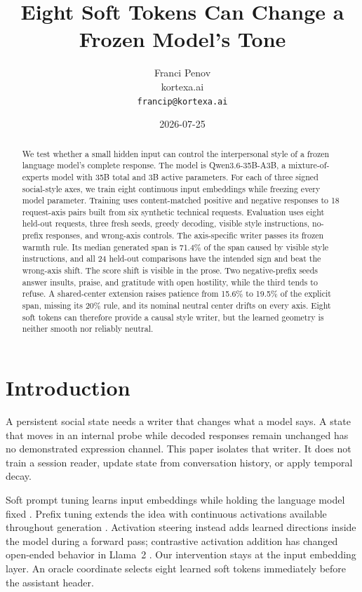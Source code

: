 \documentclass[10pt]{article}
\title{Eight Soft Tokens Can Change a Frozen Model's Tone}
\author{Franci Penov \\ kortexa.ai \\ \texttt{francip@kortexa.ai}}
\date{2026-07-25}
\newcommand{\model}{Qwen3.6-35B-A3B}
\begin{document}
\maketitle

\begin{abstract}
We test whether a small hidden input can control the interpersonal style of a
frozen language model's complete response. The model is
\model, a mixture-of-experts model with 35B total and 3B active parameters.
For each of three signed social-style axes, we train eight continuous input
embeddings while freezing every model parameter. Training uses content-matched
positive and negative responses to 18 request-axis pairs built from six
synthetic technical requests. Evaluation uses eight held-out requests, three
fresh seeds, greedy decoding, visible style instructions, no-prefix responses,
and wrong-axis controls. The axis-specific writer passes its frozen warmth
rule. Its median generated span is 71.4\% of the span caused by visible style
instructions, and all 24 held-out comparisons have the intended sign and beat
the wrong-axis shift. The score shift is visible in the prose. Two
negative-prefix seeds answer insults, praise, and gratitude with open hostility,
while the third tends to refuse. A shared-center extension raises patience from
15.6\% to 19.5\% of the explicit span, missing its 20\% rule, and its nominal
neutral center drifts on every axis. Eight soft tokens can therefore provide a
causal style writer, but the learned geometry is neither smooth nor reliably
neutral.
\end{abstract}

\section{Introduction}

A persistent social state needs a writer that changes what a model says. A
state that moves in an internal probe while decoded responses remain unchanged
has no demonstrated expression channel. This paper isolates that writer. It
does not train a session reader, update state from conversation history, or
apply temporal decay.

Soft prompt tuning learns input embeddings while holding the language model
fixed \cite{lester2021prompt}. Prefix tuning extends the idea with continuous
activations available throughout generation \cite{li2021prefix}. Activation
steering instead adds learned directions inside the model during a forward
pass; contrastive activation addition has changed open-ended behavior in
Llama~2 \cite{rimsky2024caa}. Our intervention stays at the input embedding
layer. An oracle coordinate selects eight learned soft tokens immediately
before the assistant header.
\end{document}
